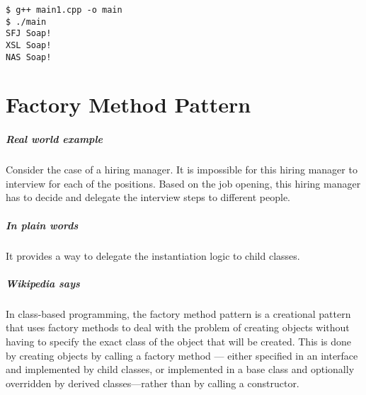 \documentclass{book}
\begin{document}
\begin{verbatim}
$ g++ main1.cpp -o main
$ ./main
SFJ Soap!
XSL Soap!
NAS Soap!
\end{verbatim}

\chapter{Factory Method Pattern}\label{FactoryMethod}

\paragraph{Real world example}

    Consider the case of a hiring manager.  It is impossible for this hiring manager to interview for each of the positions. 
    Based on the job opening, this hiring manager has to decide and delegate the interview steps to different people.

\paragraph{In plain words}

    It provides a way to delegate the instantiation logic to child classes.

\paragraph{Wikipedia says}

    In class-based programming, the factory method pattern is a creational pattern that uses factory methods to deal with the problem of creating objects
    without having to specify the exact class of the object that will be created.
    This is done by creating objects by calling a factory method — either specified in an interface and implemented by child classes,
    or implemented in a base class and optionally overridden by derived classes—rather than by calling a constructor.
\end{document}
